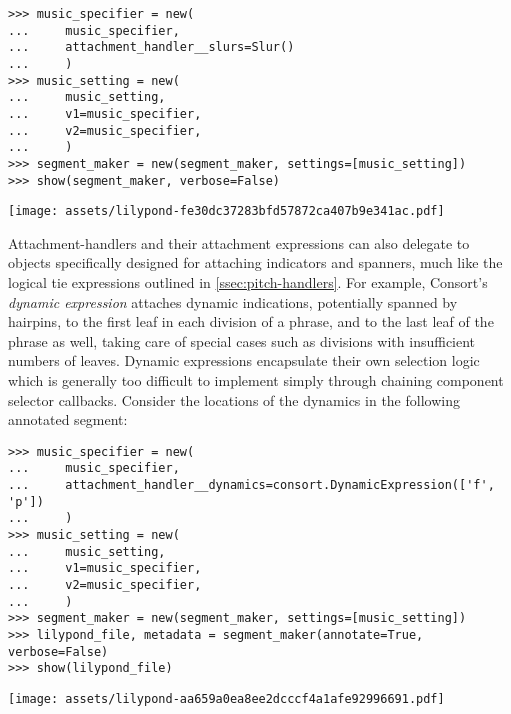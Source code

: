 \begin{abjadbookoutput}
\begin{singlespacing}
\vspace{-0.5\baselineskip}
\begin{verbatim}
>>> music_specifier = new(
...     music_specifier,
...     attachment_handler__slurs=Slur()
...     )
>>> music_setting = new(
...     music_setting,
...     v1=music_specifier,
...     v2=music_specifier,
...     )
>>> segment_maker = new(segment_maker, settings=[music_setting])
>>> show(segment_maker, verbose=False)
\end{verbatim}
\noindent\texttt{[image: assets/lilypond-fe30dc37283bfd57872ca407b9e341ac.pdf]}
\end{singlespacing}
\end{abjadbookoutput}

\noindent Attachment-handlers and their attachment expressions can also
delegate to objects specifically designed for attaching indicators and
spanners, much like the logical tie expressions outlined in
\autoref{ssec:pitch-handlers}. For example, Consort's \emph{dynamic expression}
attaches dynamic indications, potentially spanned by hairpins, to the first
leaf in each division of a phrase, and to the last leaf of the phrase as well,
taking care of special cases such as divisions with insufficient numbers of
leaves. Dynamic expressions encapsulate their own selection logic which is
generally too difficult to implement simply through chaining component selector
callbacks. Consider the locations of the dynamics in the following annotated
segment:

\begin{comment}
<abjad>[stylesheet=../consort.ily]
music_specifier = new(
    music_specifier,
    attachment_handler__dynamics=consort.DynamicExpression(['f', 'p'])
    )
music_setting = new(
    music_setting,
    v1=music_specifier,
    v2=music_specifier,
    )
segment_maker = new(segment_maker, settings=[music_setting])
lilypond_file, metadata = segment_maker(annotate=True, verbose=False)
show(lilypond_file)
</abjad>
\end{comment}

\begin{abjadbookoutput}
\begin{singlespacing}
\vspace{-0.5\baselineskip}
\begin{verbatim}
>>> music_specifier = new(
...     music_specifier,
...     attachment_handler__dynamics=consort.DynamicExpression(['f', 'p'])
...     )
>>> music_setting = new(
...     music_setting,
...     v1=music_specifier,
...     v2=music_specifier,
...     )
>>> segment_maker = new(segment_maker, settings=[music_setting])
>>> lilypond_file, metadata = segment_maker(annotate=True, verbose=False)
>>> show(lilypond_file)
\end{verbatim}
\noindent\texttt{[image: assets/lilypond-aa659a0ea8ee2dcccf4a1afe92996691.pdf]}
\end{singlespacing}
\end{abjadbookoutput}


